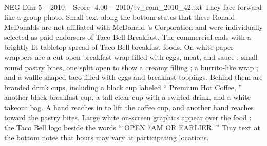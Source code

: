 \begin{textsample}{NEG Dim 5 – 2010 – Score -4.00 – 2010/tv\_com\_2010\_42.txt}
They face forward like a group photo.
Small text along the bottom states that these Ronald McDonalds are not affiliated with McDonald ’s Corporation and were individually selected as paid endorsers of Taco Bell Breakfast.
The commercial ends with a brightly lit tabletop spread of Taco Bell breakfast foods.
On white paper wrappers are a cut-open breakfast wrap filled with eggs, meat, and sauce ; small round pastry bites, one split open to show a creamy filling ; a burrito-like wrap ; and a waffle-shaped taco filled with eggs and breakfast toppings.
Behind them are branded drink cups, including a black cup labeled “ Premium Hot Coffee, ” another black breakfast cup, a tall clear cup with a swirled drink, and a white takeout bag.
A hand reaches in to lift the coffee cup, and another hand reaches toward the pastry bites.
Large white on-screen graphics appear over the food : the Taco Bell logo beside the words “ OPEN 7AM OR EARLIER. ” Tiny text at the bottom notes that hours may vary at participating locations.

\end{textsample}
